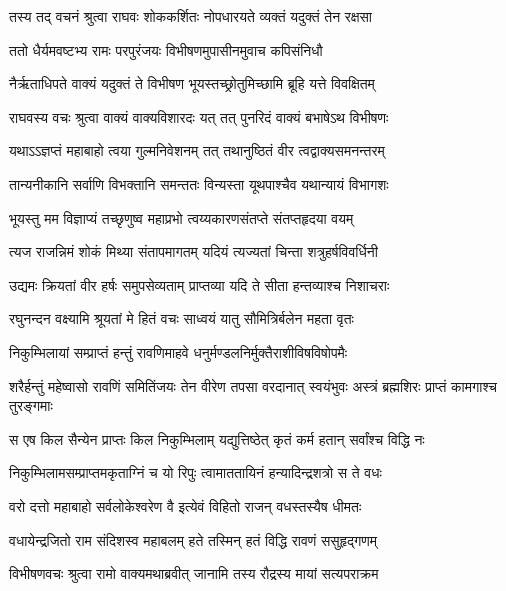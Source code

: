 
\twolineshloka
{तस्य तद् वचनं श्रुत्वा राघवः शोककर्शितः}
{नोपधारयते व्यक्तं यदुक्तं तेन रक्षसा} %

\twolineshloka
{ततो धैर्यमवष्टभ्य रामः परपुरंजयः}
{विभीषणमुपासीनमुवाच कपिसंनिधौ} %

\twolineshloka
{नैर्ऋताधिपते वाक्यं यदुक्तं ते विभीषण}
{भूयस्तच्छ्रोतुमिच्छामि ब्रूहि यत्ते विवक्षितम्} %

\twolineshloka
{राघवस्य वचः श्रुत्वा वाक्यं वाक्यविशारदः}
{यत् तत् पुनरिदं वाक्यं बभाषेऽथ विभीषणः} %

\twolineshloka
{यथाऽऽज्ञप्तं महाबाहो त्वया गुल्मनिवेशनम्}
{तत् तथानुष्ठितं वीर त्वद्वाक्यसमनन्तरम्} %

\twolineshloka
{तान्यनीकानि सर्वाणि विभक्तानि समन्ततः}
{विन्यस्ता यूथपाश्चैव यथान्यायं विभागशः} %

\twolineshloka
{भूयस्तु मम विज्ञाप्यं तच्छृणुष्व महाप्रभो}
{त्वय्यकारणसंतप्ते संतप्तहृदया वयम्} %

\twolineshloka
{त्यज राजन्निमं शोकं मिथ्या संतापमागतम्}
{यदियं त्यज्यतां चिन्ता शत्रुहर्षविवर्धिनी} %

\twolineshloka
{उद्यमः क्रियतां वीर हर्षः समुपसेव्यताम्}
{प्राप्तव्या यदि ते सीता हन्तव्याश्च निशाचराः} %

\twolineshloka
{रघुनन्दन वक्ष्यामि श्रूयतां मे हितं वचः}
{साध्वयं यातु सौमित्रिर्बलेन महता वृतः} %

\twolineshloka
{निकुम्भिलायां सम्प्राप्तं हन्तुं रावणिमाहवे}
{धनुर्मण्डलनिर्मुक्तैराशीविषविषोपमैः} %

\threelineshloka
{शरैर्हन्तुं महेष्वासो रावणिं समितिंजयः}
{तेन वीरेण तपसा वरदानात् स्वयंभुवः}
{अस्त्रं ब्रह्मशिरः प्राप्तं कामगाश्च तुरङ्गमाः} %

\twolineshloka
{स एष किल सैन्येन प्राप्तः किल निकुम्भिलाम्}
{यद्युत्तिष्ठेत् कृतं कर्म हतान् सर्वांश्च विद्धि नः} %

\twolineshloka
{निकुम्भिलामसम्प्राप्तमकृताग्निं च यो रिपुः}
{त्वामाततायिनं हन्यादिन्द्रशत्रो स ते वधः} %

\twolineshloka
{वरो दत्तो महाबाहो सर्वलोकेश्वरेण वै}
{इत्येवं विहितो राजन् वधस्तस्यैष धीमतः} %

\twolineshloka
{वधायेन्द्रजितो राम संदिशस्व महाबलम्}
{हते तस्मिन् हतं विद्धि रावणं ससुहृद्गणम्} %

\twolineshloka
{विभीषणवचः श्रुत्वा रामो वाक्यमथाब्रवीत्}
{जानामि तस्य रौद्रस्य मायां सत्यपराक्रम} %

